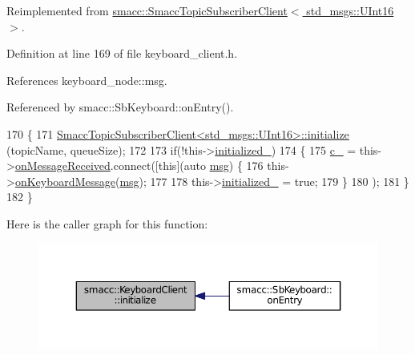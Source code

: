 Reimplemented from \hyperlink{classsmacc_1_1SmaccTopicSubscriberClient_a8733cf96ffafbf778b9f2a337113f4f8}{smacc\+::\+Smacc\+Topic\+Subscriber\+Client$<$ std\+\_\+msgs\+::\+U\+Int16 $>$}.



Definition at line 169 of file keyboard\+\_\+client.\+h.



References keyboard\+\_\+node\+::msg.



Referenced by smacc\+::\+Sb\+Keyboard\+::on\+Entry().


\begin{DoxyCode}
170         \{
171                 \hyperlink{classsmacc_1_1SmaccTopicSubscriberClient_a8733cf96ffafbf778b9f2a337113f4f8}{SmaccTopicSubscriberClient<std\_msgs::UInt16>::initialize}
      (topicName, queueSize);
172 
173                 \textcolor{keywordflow}{if}(!this->\hyperlink{classsmacc_1_1KeyboardClient_a7f898274b2d8035d00cef340103763f0}{initialized\_})
174                 \{
175                         \hyperlink{classsmacc_1_1KeyboardClient_ae0bf7c699ccb45ee933cf266ebb6107d}{c\_} = this->\hyperlink{classsmacc_1_1SmaccTopicSubscriberClient_a4260d955152200804e9c51a1098965c8}{onMessageReceived}.connect([\textcolor{keyword}{this}](\textcolor{keyword}{auto} 
      \hyperlink{namespacekeyboard__node_a768777e12f75b89e4a0a60acf748e9eb}{msg}) \{
176                                 this->\hyperlink{classsmacc_1_1KeyboardClient_ab34777f20c37a6c9a647fef3a76ca522}{onKeyboardMessage}(\hyperlink{namespacekeyboard__node_a768777e12f75b89e4a0a60acf748e9eb}{msg});
177 
178                         this->\hyperlink{classsmacc_1_1KeyboardClient_a7f898274b2d8035d00cef340103763f0}{initialized\_} = \textcolor{keyword}{true};
179                 \}
180                 );
181                 \}
182         \}
\end{DoxyCode}


Here is the caller graph for this function\+:
\nopagebreak
\begin{figure}[H]
\begin{center}
\leavevmode
\includegraphics[width=350pt]{classsmacc_1_1KeyboardClient_a0f845a83b14ff666559e90e3861ff207_icgraph}
\end{center}
\end{figure}


